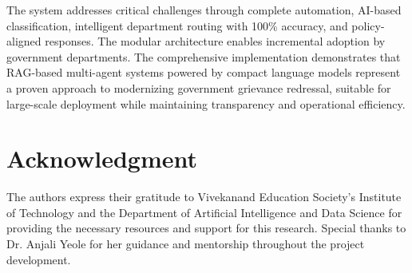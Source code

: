 \documentclass[conference]{IEEEtran}
\begin{document}
The system addresses critical challenges through complete automation, AI-based classification, intelligent department routing with 100\% accuracy, and policy-aligned responses. The modular architecture enables incremental adoption by government departments. The comprehensive implementation demonstrates that RAG-based multi-agent systems powered by compact language models represent a proven approach to modernizing government grievance redressal, suitable for large-scale deployment while maintaining transparency and operational efficiency.

\section*{Acknowledgment}

The authors express their gratitude to Vivekanand Education Society's Institute of Technology and the Department of Artificial Intelligence and Data Science for providing the necessary resources and support for this research. Special thanks to Dr. Anjali Yeole for her guidance and mentorship throughout the project development.
\end{document}
